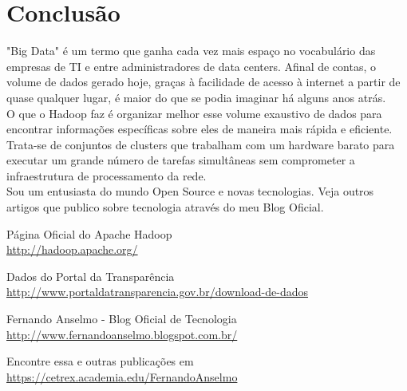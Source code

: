 \documentclass[a4paper,11pt]{article}
\begin{document}
\section{Conclusão}
"Big Data" é um termo que ganha cada vez mais espaço no vocabulário das empresas de TI e entre administradores de data centers. Afinal de contas, o volume de dados gerado hoje, graças à facilidade de acesso à internet a partir de quase qualquer lugar, é maior do que se podia imaginar há alguns anos atrás. \\[2mm]
O que o Hadoop faz é organizar melhor esse volume exaustivo de dados para encontrar informações específicas sobre eles de maneira mais rápida e eficiente. Trata-se de conjuntos de clusters que trabalham com um hardware barato para executar um grande número de tarefas simultâneas sem comprometer a infraestrutura de processamento da rede. \\[2mm]
Sou um entusiasta do mundo Open Source e novas tecnologias. Veja outros artigos que publico sobre tecnologia através do meu Blog Oficial\cite{fernandoanselmo}.

\begin{thebibliography}{4}
	
	Página Oficial do Apache Hadoop \\
	\url{http://hadoop.apache.org/}
	
	Dados do Portal da Transparência \\
	\url{http://www.portaldatransparencia.gov.br/download-de-dados}
	
	Fernando Anselmo - Blog Oficial de Tecnologia \\
	\url{http://www.fernandoanselmo.blogspot.com.br/}

	Encontre essa e outras publicações em \\
	\url{https://cetrex.academia.edu/FernandoAnselmo}
	
\end{thebibliography}
\end{document}
